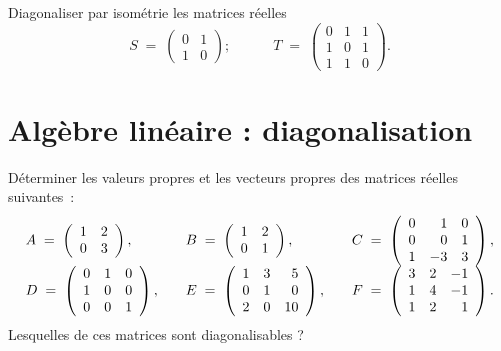 \documentclass[12pt,french,oneside,a4paper]{memoir} %
\begin{document}
\begin{exo}
Diagonaliser par isométrie les matrices réelles
\begin{equation*}
S \;=\; 
\left(\begin{array}{rr}
0 & 1\\
1 & 0
\end{array}\right);
\quad\qquad
T \;=\; 
\left(\begin{array}{rrr}
0 & 1 & 1\\
1 & 0 & 1\\
1 & 1 & 0
\end{array}\right).
\end{equation*}
\end{exo}
\chapter{Algèbre linéaire : diagonalisation}

\begin{exo}
 Déterminer les valeurs propres et les vecteurs propres des matrices 
réelles suivantes~:
\begin{equation*}
\begin{array}{l@{\qquad}l@{\qquad}l}
%
A\;=\; \left( \begin{array}{rr}
1 &2 \\
0 &3 \end{array} \right),
&%
B\;=\; \left( \begin{array}{rr}
1 &2 \\
0 &1 \end{array} \right),
&%
C \;=\; \left( \begin{array}{crc}
0 &1 &0 \\
0 &0 &1 \\
1 &-3 &3 \end{array} \right), 
\\[4mm]%
D\;=\; \left( \begin{array}{rrr}
0 &1 &0 \\
1 &0 &0 \\
0 &0 &1 \end{array} \right),
&%
E \;=\; \left( \begin{array}{rrr}
1 &3 &5 \\
0 &1 &0 \\
2 &0 &10 \end{array} \right),
&%
F\;=\; \left( \begin{array}{rrr}
3 &2 &-1 \\
1 &4 &-1 \\
1 &2 &1 \end{array} \right).
\end{array}
\end{equation*}
Lesquelles de ces matrices sont diagonalisables ?
\end{exo}
\end{document}
